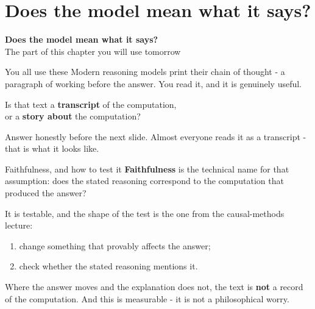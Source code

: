 \documentclass[aspectratio=169]{beamer}
\newcommand{\trapbox}[1]{%
  \begin{tcolorbox}[colback=armred!8, colframe=armred, boxrule=0.6pt, arc=2pt]
  #1
  \end{tcolorbox}}
\newcommand{\sectiontransition}[2]{%
  \begin{frame}[plain]
    \vfill
    \begin{center}
      {\Huge\bfseries\color{popblue} #1}\\[1.1em]
      {\large #2}
    \end{center}
    \vfill
  \end{frame}}
\begin{document}
\section{Does the model mean what it says?}
\sectiontransition{Does the model mean what it says?}{The part of this chapter you will use tomorrow}

\begin{frame}{You all use these}
  \vspace{0.8em}
  Modern reasoning models print their chain of thought - a paragraph of working before the
  answer. You read it, and it is genuinely useful.

  \vspace{1.0em}
  \begin{center}
    {\large Is that text a \textbf{transcript} of the computation,\\ or a \textbf{story about}
    the computation?}
  \end{center}

  \vspace{1.0em}
  \begin{center}
    {\footnotesize Answer honestly before the next slide. Almost everyone reads it as a
    transcript - that is what it looks like.}
  \end{center}
\end{frame}

\begin{frame}{Faithfulness, and how to test it}
  \vspace{0.7em}
  \textbf{Faithfulness} is the technical name for that assumption: does the stated reasoning
  correspond to the computation that produced the answer?

  \vspace{0.8em}
  It is testable, and the shape of the test is the one from the causal-methods lecture:

  \vspace{0.5em}
  \begin{enumerate}
    \item change something that provably affects the answer;
    \item check whether the stated reasoning mentions it.
  \end{enumerate}

  \vspace{0.9em}
  \trapbox{Where the answer moves and the explanation does not, the text is \textbf{not} a
  record of the computation. And this is measurable - it is not a philosophical worry.}
\end{frame}
\end{document}
